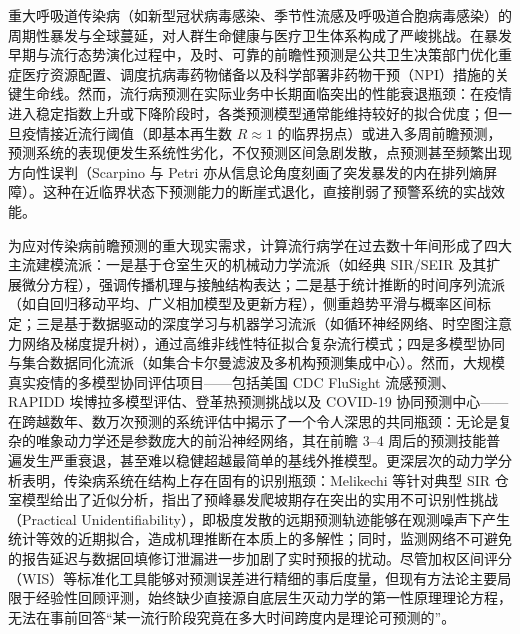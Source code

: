 \documentclass[11pt,a4paper]{article}
\theoremstyle{plain}
\theoremstyle{definition}
\begin{document}
重大呼吸道传染病（如新型冠状病毒感染、季节性流感及呼吸道合胞病毒感染）的周期性暴发与全球蔓延，对人群生命健康与医疗卫生体系构成了严峻挑战。在暴发早期与流行态势演化过程中，及时、可靠的前瞻性预测是公共卫生决策部门优化重症医疗资源配置、调度抗病毒药物储备以及科学部署非药物干预（NPI）措施的关键生命线。然而，流行病预测在实际业务中长期面临突出的性能衰退瓶颈：在疫情进入稳定指数上升或下降阶段时，各类预测模型通常能维持较好的拟合优度；但一旦疫情接近流行阈值（即基本再生数 $R \approx 1$ 的临界拐点）或进入多周前瞻预测，预测系统的表现便发生系统性劣化，不仅预测区间急剧发散，点预测甚至频繁出现方向性误判\citep{scarpino2019predictability, reich2019collaborative}（Scarpino 与 Petri\citep{scarpino2019predictability} 亦从信息论角度刻画了突发暴发的内在排列熵屏障）。这种在近临界状态下预测能力的断崖式退化，直接削弱了预警系统的实战效能。

为应对传染病前瞻预测的重大现实需求，计算流行病学在过去数十年间形成了四大主流建模流派：一是基于仓室生灭的机械动力学流派（如经典 SIR/SEIR 及其扩展微分方程），强调传播机理与接触结构表达；二是基于统计推断的时间序列流派（如自回归移动平均、广义相加模型及更新方程），侧重趋势平滑与概率区间标定；三是基于数据驱动的深度学习与机器学习流派（如循环神经网络、时空图注意力网络及梯度提升树），通过高维非线性特征拟合复杂流行模式；四是多模型协同与集合数据同化流派（如集合卡尔曼滤波及多机构预测集成中心）。然而，大规模真实疫情的多模型协同评估项目——包括美国 CDC FluSight 流感预测\citep{mcgowan2019collaborative, flusight2024evaluation}、RAPIDD 埃博拉多模型评估\citep{viboud2018rapidd}、登革热预测挑战\citep{johansson2019open}以及 COVID-19 协同预测中心\citep{cramer2022evaluation}——在跨越数年、数万次预测的系统评估中揭示了一个令人深思的共同瓶颈：无论是复杂的唯象动力学还是参数庞大的前沿神经网络，其在前瞻 3--4 周后的预测技能普遍发生严重衰退，甚至难以稳健超越最简单的基线外推模型\citep{suez2026baseline, lopez2024challenges}。更深层次的动力学分析表明，传染病系统在结构上存在固有的识别瓶颈：Melikechi 等\citep{melikechi2022limits}针对典型 SIR 仓室模型给出了近似分析，指出了预峰暴发爬坡期存在突出的实用不可识别性挑战（Practical Unidentifiability），即极度发散的远期预测轨迹能够在观测噪声下产生统计等效的近期拟合，造成机理推断在本质上的多解性；同时，监测网络不可避免的报告延迟与数据回填修订泄漏进一步加剧了实时预报的扰动\citep{mcdonald2021auxiliary}。尽管加权区间评分（WIS）\citep{bracher2021evaluating}等标准化工具能够对预测误差进行精细的事后度量，但现有方法论主要局限于经验性回顾评测，始终缺少直接源自底层生灭动力学的第一性原理理论方程，无法在事前回答“某一流行阶段究竟在多大时间跨度内是理论可预测的”。
\end{document}
